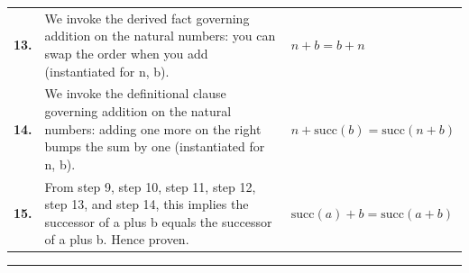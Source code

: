 \documentclass[11pt]{article}
\theoremstyle{definition}
\begin{document}
\begin{tabular}{@{} >{\raggedright\arraybackslash}p{} >{\raggedright\arraybackslash}p{} >{\raggedleft\arraybackslash}p{} @{}}
\textbf{13.} & We invoke the derived fact governing addition on the natural numbers: you can swap the order when you add (instantiated for n, b). & $\displaystyle n + b = b + n$ \\[0.45em]
\textbf{14.} & We invoke the definitional clause governing addition on the natural numbers: adding one more on the right bumps the sum by one (instantiated for n, b). & $\displaystyle n + \mathrm{succ}(b) = \mathrm{succ}(n + b)$ \\[0.45em]
\textbf{15.} & From step 9, step 10, step 11, step 12, step 13, and step 14, this implies the successor of a plus b equals the successor of a plus b. Hence proven. & $\displaystyle \mathrm{succ}(a) + b = \mathrm{succ}(a + b)$ \\[0.45em]
\bottomrule
\end{tabular}
\label{thm:Nat-addition-successor_on_the_left_steps_the_sum}
\par\medskip\hrule
\end{document}
